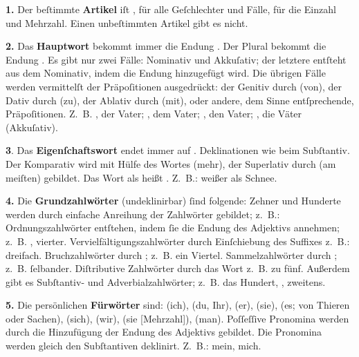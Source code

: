 {\fr \large
    \textbf{1.} Der beſtimmte \textbf{Artikel} iſt , für alle Geſchlechter und Fälle, für die Einzahl und Mehrzahl. Einen unbeſtimmten Artikel gibt es nicht.
    
    \textbf{2.} Das \textbf{Hauptwort} bekommt immer die Endung . Der Plural bekommt die Endung . Es gibt nur zwei Fälle: Nominativ und Akkuſativ; der letztere entſteht aus dem Nominativ, indem die Endung  hinzugefügt wird. Die übrigen Fälle werden vermittelſt der Präpoſitionen ausgedrückt: der Genitiv durch  (von), der Dativ durch  (zu), der Ablativ durch  (mit), oder andere, dem Sinne entſprechende, Präpoſitionen. Z.~B. , der Vater; , dem Vater; , den Vater; , die Väter (Akkuſativ).
    
    \textbf{3}. Das \textbf{Eigenſchaftswort} endet immer auf . Deklinationen wie beim Subſtantiv. Der Komparativ wird mit Hülfe des Wortes  (mehr), der Superlativ durch  (am meiſten) gebildet. Das Wort \glqq{}als\grqq{} heißt . Z.~B.:  weißer als Schnee.
    
    \textbf{4.} Die \textbf{Grundzahlwörter} (undeklinirbar) ſind folgende:  Zehner und Hunderte werden durch einfache Anreihung der Zahlwörter gebildet; z.~B.:  Ordnungszahlwörter entſtehen, indem ſie die Endung des Adjektivs annehmen; z.~B. , vierter. Vervielfältigungszahlwörter  durch Einſchiebung des Suffixes  z.~B.:  dreifach. Bruchzahlwörter  durch ; z.~B.  ein Viertel. Sammelzahlwörter  durch ; z.~B.  ſelbander. Diſtributive Zahlwörter  durch das Wort  z.~B.  zu fünf. Außerdem gibt es Subſtantiv- und Adverbialzahlwörter; z.~B.  das Hundert, , zweitens.
    
    \textbf{5.} Die persönlichen \textbf{Fürwörter} sind:  (ich),  (du, Ihr),  (er),  (sie),  (es; von Thieren oder Sachen),  (sich),  (wir),  (sie [Mehrzahl]),  (man). Poſſeſſive Pronomina werden durch die Hinzufügung der Endung des Adjektivs gebildet. Die Pronomina werden gleich den Subſtantiven deklinirt. Z.~B.:  mein,  mich.
       
}

